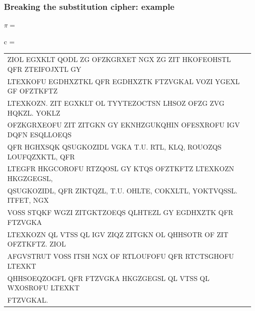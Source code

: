 \documentclass[aspectratio=169, lualatex, handout, 10pt,dvipsnames,svgnames]{beamer} %
\def\enrouge#1{\textcolor{rouge}{#1}}
\begin{document}
\begin{frame}
  \frametitle{Breaking the substitution cipher: example}

  \enrouge{
    \tiny{$\pi=
      $}}
  \vspace{0.25cm}

  
  \color{vert}
  \tiny{c =
    \begin{tabular}[t]{l}
      ZIOL EGXKLT QODL ZG OFZKGRXET NGX ZG ZIT HKOFEOHSTL QFR ZTEIFOJXTL GY \\
      LTEXKOFU EGDHXZTKL QFR EGDHXZTK FTZVGKAL VOZI YGEXL GF OFZTKFTZ \\
      LTEXKOZN. ZIT EGXKLT OL TYYTEZOCTSN LHSOZ OFZG ZVG HQKZL. YOKLZ \\
      OFZKGRXEOFU ZIT ZITGKN GY EKNHZGUKQHIN OFESXROFU IGV DQFN ESQLLOEQS \\
      QFR HGHXSQK QSUGKOZIDL VGKA T.U. RTL, KLQ, ROUOZQS LOUFQZXKTL, QFR \\
      LTEGFR HKGCOROFU RTZQOSL GY KTQS OFZTKFTZ LTEXKOZN HKGZGEGSL, \\
      QSUGKOZIDL, QFR ZIKTQZL, T.U. OHLTE, COKXLTL, YOKTVQSSL. ITFET, NGX \\
      VOSS STQKF WGZI ZITGKTZOEQS QLHTEZL GY EGDHXZTK QFR FTZVGKA \\
      LTEXKOZN QL VTSS QL IGV ZIQZ ZITGKN OL QHHSOTR OF ZIT OFZTKFTZ. ZIOL \\
      AFGVSTRUT VOSS ITSH NGX OF RTLOUFOFU QFR RTCTSGHOFU LTEXKT \\
      QHHSOEQZOGFL QFR FTZVGKA HKGZGEGSL QL VTSS QL WXOSROFU LTEXKT \\
      FTZVGKAL.
    \end{tabular}
  }
  \vspace{0.5cm}

  \normalsize
  \color{black}{Most common letters in c: t $>$ z $>$ o $>$ l}
\end{frame}
\end{document}
